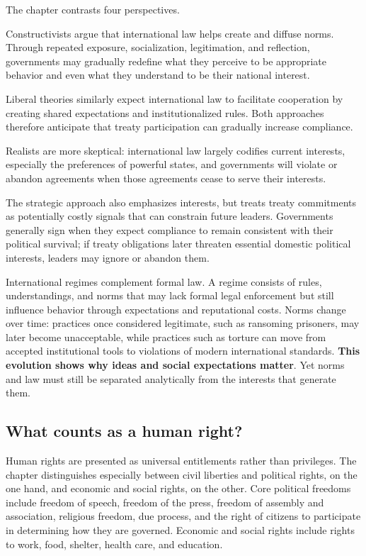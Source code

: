 The chapter contrasts four perspectives.

Constructivists argue that international law helps create and diffuse norms. Through repeated exposure, socialization, legitimation, and reflection, governments may gradually redefine what they perceive to be appropriate behavior and even what they understand to be their national interest.

Liberal theories similarly expect international law to facilitate cooperation by creating shared expectations and institutionalized rules. Both approaches therefore anticipate that treaty participation can gradually increase compliance.

Realists are more skeptical: international law largely codifies current interests, especially the preferences of powerful states, and governments will violate or abandon agreements when those agreements cease to serve their interests.

The strategic approach also emphasizes interests, but treats treaty commitments as potentially costly signals that can constrain future leaders. Governments generally sign when they expect compliance to remain consistent with their political survival; if treaty obligations later threaten essential domestic political interests, leaders may ignore or abandon them.

International regimes complement formal law. A regime consists of rules, understandings, and norms that may lack formal legal enforcement but still influence behavior through expectations and reputational costs. Norms change over time: practices once considered legitimate, such as ransoming prisoners, may later become unacceptable, while practices such as torture can move from accepted institutional tools to violations of modern international standards. \textbf{This evolution shows why ideas and social expectations matter}. Yet norms and law must still be separated analytically from the interests that generate them.

\subsection{What counts as a human right?}

Human rights are presented as universal entitlements rather than privileges. The chapter distinguishes especially between civil liberties and political rights, on the one hand, and economic and social rights, on the other. Core political freedoms include freedom of speech, freedom of the press, freedom of assembly and association, religious freedom, due process, and the right of citizens to participate in determining how they are governed. Economic and social rights include rights to work, food, shelter, health care, and education.

